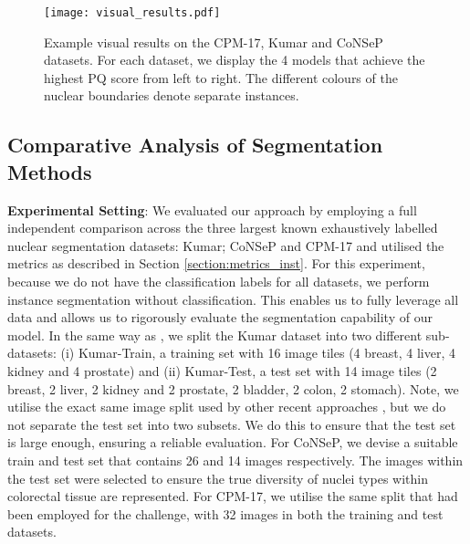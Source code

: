 \documentclass[journal]{IEEEtran}
\begin{document}
\begin{table*}[t]
\begin{center}
{\begin{tabular}{c|ccccc|ccccc|ccccc}
					\bottomrule
				\end{tabular}
			}
		\end{center}
	\end{table*}
	
 	\begin{figure*}[!t]
		\centering
		\texttt{[image: visual\_results.pdf]} 
		\caption{Example visual results on the CPM-17, Kumar and CoNSeP datasets. For each dataset, we display the 4 models that achieve the highest PQ score from left to right. The different colours of the nuclear boundaries denote separate instances.}
		\label{fig:dataset_samples}
	\end{figure*}
	
	\subsection{Comparative Analysis of Segmentation Methods} \label{section:comparison}
	

	\textbf{Experimental Setting}:
	We evaluated our approach by employing a full independent comparison across the three largest known exhaustively labelled nuclear segmentation datasets: Kumar; CoNSeP and CPM-17 and utilised the metrics as described in Section \ref{section:metrics_inst}. For this experiment, because we do not have the classification labels for all datasets, we perform instance segmentation without classification. This enables us to fully leverage all data and allows us to rigorously evaluate the segmentation capability of our model. In the same way as \cite{kumar}, we split the Kumar dataset into two different sub-datasets: (i) Kumar-Train, a training set with 16 image tiles (4 breast, 4 liver, 4 kidney and 4 prostate) and (ii) Kumar-Test, a test set with 14 image tiles (2 breast, 2 liver, 2 kidney and 2 prostate, 2 bladder, 2 colon, 2 stomach). Note, we utilise the exact same image split used by other recent approaches \cite{kumar, naylor2018segmentation, zhou2019cia}, but we do not separate the test set into two subsets. We do this to ensure that the test set is large enough, ensuring a reliable evaluation. For CoNSeP, we devise a suitable train and test set that contains 26 and 14 images respectively. The images within the test set were selected to ensure the true diversity of nuclei types within colorectal tissue are represented. For CPM-17, we utilise the same split that had been employed for the challenge, with 32 images in both the training and test datasets. 
	
\end{document}
